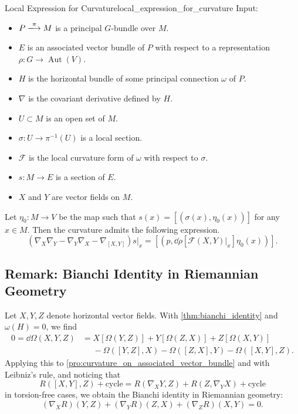\documentclass{article}
\begin{document}
\begin{proposition}{Local Expression for Curvature}{local_expression_for_curvature}
    Input:
    \begin{itemize}
        \item $P\xlongrightarrow{\pi} M$ is a principal $G$-bundle over $M$.
        \item $E$ is an associated vector bundle of $P$ with respect to a representation $\rho: G\rightarrow \operatorname{Aut}(V)$.
        \item $H$ is the horizontal bundle of some principal connection $\omega$ of $P$.
        \item $\nabla$ is the covariant derivative defined by $H$.
        \item $U\subset M$ is an open set of $M$.
        \item $\sigma: U \rightarrow \pi^{-1}(U)$ is a local section.
        \item $\mathcal{F}$ is the local curvature form of $\omega$ with respect to $\sigma$.
        \item $s: M \rightarrow E$ is a section of $E$.
        \item $X$ and $Y$ are vector fields on $M$.
    \end{itemize}
    Let $\eta_0: M \rightarrow V$ be the map such that $s(x) = [(\sigma(x), \eta_0(x))]$ for any $x\in M$.
    Then the curvature admits the following expression.
    \[ (\nabla_X \nabla_Y - \nabla_Y \nabla_X - \nabla_{[X,Y]})s\vert_x = [(p, \dd{\rho}[\mathcal{F}(X, Y)\vert_x]\eta_0(x))]. \]
\end{proposition}

\subsection{Remark: Bianchi Identity in Riemannian Geometry}

Let $X,Y,Z$ denote horizontal vector fields.
With \cref{thm:bianchi_identity} and $\omega(H) = 0$, we find
\begin{align*}
    0 = \dd{\Omega}(X,Y,Z) &= X[\Omega(Y,Z)] + Y[\Omega(Z,X)] + Z[\Omega(X,Y)] \\
    &\phantom{{}={}} {} - \Omega([Y,Z],X) - \Omega([Z,X],Y) - \Omega([X,Y],Z).
\end{align*}
Applying this to \cref{pro:curvature_on_associated_vector_bundle} and with Leibniz's rule, and noticing that
\[ R([X,Y],Z) + \text{cycle} = R(\nabla_X Y, Z) + R(Z, \nabla_Y X) + \text{cycle} \]
in torsion-free cases, we obtain the Bianchi identity in Riemannian geometry:
\[ (\nabla_X R)(Y,Z) + (\nabla_Y R)(Z,X) + (\nabla_Z R)(X,Y) = 0. \]

% 
% 
\end{document}
